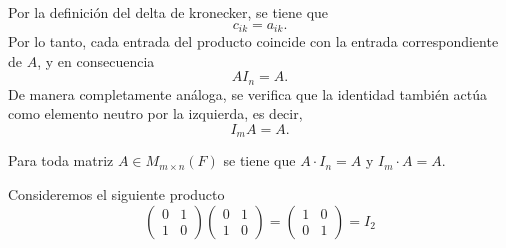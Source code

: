 \documentclass[12pt,a4paper]{book}
\begin{document}
    Por la definición del delta de kronecker, se tiene que
    \begin{equation*}
        c_{ik}=a_{ik}.
    \end{equation*}
    Por lo tanto, cada entrada del producto coincide con la entrada correspondiente de $A$, y en consecuencia
    \begin{equation*}
        AI_{n}=A.
    \end{equation*}
    De manera completamente análoga, se verifica que la identidad también actúa como
    elemento neutro por la izquierda, es decir,
    \begin{equation*}
        I_{m}A=A.
    \end{equation*}

    \begin{proposicion}
        Para toda matriz $A\in M_{m\times n}(F)$ se tiene que $A\cdot I_{n}=A$ y
        $I_{m}\cdot A=A$.
    \end{proposicion}

    \begin{ejemplo}
        Consideremos el siguiente producto
        \begin{equation*}
            \begin{pmatrix}
                0 & 1\\
                1 & 0
            \end{pmatrix}
            \begin{pmatrix}
                0 & 1\\
                1 & 0
            \end{pmatrix}
            =
            \begin{pmatrix}
                1 & 0\\
                0 & 1
            \end{pmatrix}
            =I_{2}
        \end{equation*}
    \end{ejemplo}
\end{document}
